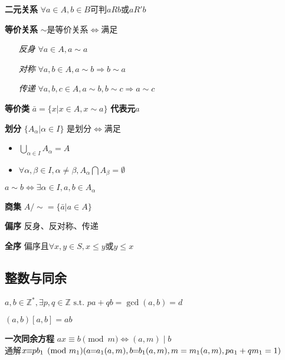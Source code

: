 \documentclass[b4paper, 10pt]{ctexart}
\newcommand*{\setZ}{\mathbb{Z}}
\newcommand*{\st}{\text{ s.t. }}
\newcommand*{\impl}{\Rightarrow}
\renewcommand*{\iff}{\Leftrightarrow}
\renewcommand*{\leq}{\leqslant}
\begin{document}
\begin{multicols}{3}
    \textbf{二元关系} $\forall a \!\in\! A, b \!\in\! B$可判$\!aRb\!$或$\!aR'b\!$

    \textbf{等价关系} $\sim$是等价关系$\iff$满足

    \begin{itemize}
        \item[\emph{反身}] $\forall a \!\in\! A, a \sim a$
        \item[\emph{对称}] $\forall a, b \!\in\! A, a \sim b \impl b \sim a$
        \item[\emph{传递}] $\forall a, b, c \!\in\! A, a \sim b, b \sim c \impl a \sim c $
    \end{itemize}

    \textbf{等价类} $\bar{a} = \{ x | x \in A, x \sim a \}$ \textbf{代表元}$a$

    \textbf{划分} $\{ A_\alpha | \alpha \in I \}$ 是划分$\iff$满足

    \begin{itemize}
        \item $\bigcup\limits_{\alpha \in I} A_\alpha = A$
        \item $\forall \alpha, \beta \in I, \alpha \ne \beta, A_\alpha \bigcap A_\beta = \emptyset$
    \end{itemize}

    \begin{theorem}[等价与划分]
        $a \sim b \iff \exists \alpha \in I, a, b \in A_\alpha$
    \end{theorem}

    \textbf{商集} $A/\sim = \{ \bar{a} | a \in A \}$

    \textbf{偏序} 反身、反对称、传递

    \textbf{全序} 偏序且$\forall x, y \in S, x \leq y$或$y \leq x$

    \subsection{整数与同余}

    \begin{theorem}[Bézout定理]
        $a, b \in \setZ^*, \exists p, q \in \setZ \st pa + qb = \gcd(a, b) = d$
    \end{theorem}

    \begin{theorem}
        $(a, b)[a, b] = ab$
    \end{theorem}

    \textbf{一次同余方程} $ax \!\equiv\! b \pmod{m} \iff (a, m) \!\mid\! b$\\
    通解$x \!\!\equiv\!\! pb_1 \pmod{m_1} (a \!\! = \!\! a_1(a, m), b \!\! = \!\! b_1(a, m), \\ m = m_1(a, m), pa_1 +qm_1 = 1)$


\end{multicols}
\end{document}
